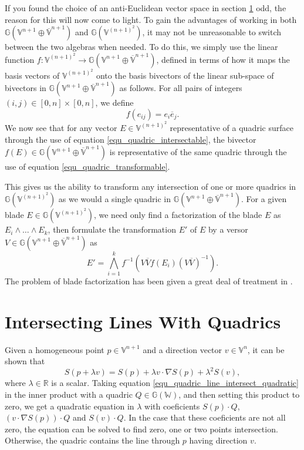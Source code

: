 \documentclass{birkjour}
\theoremstyle{definition}
\theoremstyle{remark}
\numberwithin{equation}{section}
\newcommand{\G}{\mathbb{G}}
\newcommand{\V}{\mathbb{V}}
\newcommand{\Vb}{\mathbb{\overline{V}}}
\newcommand{\W}{\mathbb{W}}
\newcommand{\R}{\mathbb{R}}
\begin{document}

If you found the choice of an anti-Euclidean vector
space in section \ref{} odd, the reason for this will
now come to light.  To gain the advantages of working
in both $\G(\V^{n+1}\oplus\Vb^{n+1})$ and $\G(\V^{(n+1)^2})$,
it may not be unreasonable to switch between the two
algebras when needed.  To do this, we simply use the linear
function $f:\V^{(n+1)^2}\to\G(\V^{n+1}\oplus\Vb^{n+1})$,
defined in terms of how it maps the basis vectors of $\V^{(n+1)^2}$ onto the
basis bivectors of the linear sub-space of bivectors in $\G(\V^{n+1}\oplus\Vb^{n+1})$ as follows.
For all pairs of integers $(i,j)\in[0,n]\times[0,n]$, we define
\begin{equation}
f(e_{ij})=e_i\overline{e}_j.
\end{equation}
We now see that for any vector $E\in\V^{(n+1)^2}$ representative of
a quadric surface through the use of equation \eqref{equ_quadric_intersectable}, the bivector
$f(E)\in\G(\V^{n+1}\oplus\Vb^{n+1})$ is representative of the same
quadric through the use of equation \eqref{equ_quadric_transformable}.

This gives us the ability to transform any intersection of one or more quadrics
in $\G(\V^{(n+1)^2})$ as we would a single quadric in $\G(\V^{n+1}\oplus\Vb^{n+1})$.
For a given blade $E\in\G(\V^{(n+1)^2})$, we need only find a factorization
of the blade $E$ as $E_i\wedge\dots\wedge E_k$, then formulate the transformation $E'$
of $E$ by a versor $V\in\G(\V^{n+1}\oplus\Vb^{n+1})$ as
\begin{equation}
E' = \bigwedge_{i=1}^k f^{-1}\left(V\overline{V}f(E_i)(V\overline{V})^{-1}\right).
\end{equation}
The problem of blade factorization has been given a great deal of treatment in \cite{}.

\section{Intersecting Lines With Quadrics}

Given a homogeneous point $p\in\V^{n+1}$ and a direction vector $v\in\V^n$,
it can be shown that
\begin{equation}\label{equ_quadric_line_intersect_quadratic}
S(p+\lambda v) = S(p)+\lambda v\cdot\nabla S(p)+\lambda^2 S(v),
\end{equation}
where $\lambda\in\R$ is a scalar.  Taking equation \eqref{equ_quadric_line_intersect_quadratic} in the
inner product with a quadric $Q\in\G(\W)$, and then setting this
product to zero, we get a quadratic equation in $\lambda$ with
coeficients $S(p)\cdot Q$, $(v\cdot\nabla S(p))\cdot Q$ and $S(v)\cdot Q$.
In the case that these coeficients are not all zero, the equation can be
solved to find zero, one or two points intersection.  Otherwise, the quadric
contains the line through $p$ having direction $v$.
\end{document}
